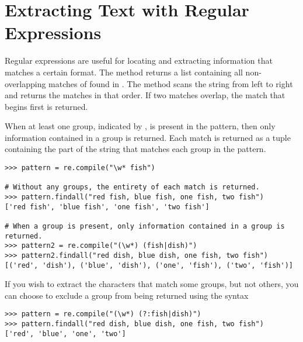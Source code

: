 \section*{Extracting Text with Regular Expressions} %

Regular expressions are useful for locating and extracting information that matches a certain format.
The method  returns a list containing all non-overlapping matches of  found in .
The method scans the string from left to right and returns the matches in that order.
If two matches overlap, the match that begins first is returned.

When at least one group, indicated by \li{()}, is present in the pattern, then only information contained in a group is returned. Each match is returned as a tuple containing the part of the string that matches each group in the pattern.

\begin{lstlisting}
>>> pattern = re.compile("\w* fish")

# Without any groups, the entirety of each match is returned.
>>> pattern.findall("red fish, blue fish, one fish, two fish")
['red fish', 'blue fish', 'one fish', 'two fish']

# When a group is present, only information contained in a group is returned.
>>> pattern2 = re.compile("(\w*) (fish|dish)")
>>> pattern2.findall("red dish, blue dish, one fish, two fish")
[('red', 'dish'), ('blue', 'dish'), ('one', 'fish'), ('two', 'fish')]
\end{lstlisting}

If you wish to extract the characters that match some groups, but not others, you can choose to exclude a group from being returned using the syntax 

\begin{lstlisting}
>>> pattern = re.compile("(\w*) (?:fish|dish)")
>>> pattern.findall("red dish, blue dish, one fish, two fish")
['red', 'blue', 'one', 'two']
\end{lstlisting}



